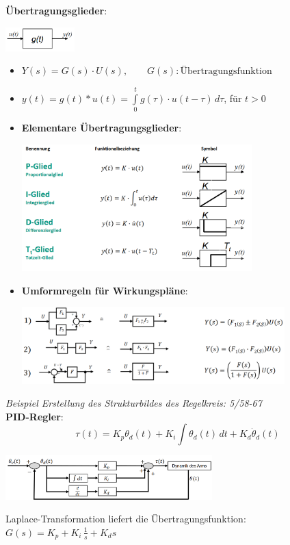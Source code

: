 \textbf{Übertragungsglieder}:
\begin{center}
	\includegraphics[width=0.2\textwidth]{images/uglied.png}
\end{center}
\begin{itemize}
	\item $Y(s)=G(s)\cdot U(s),\qquad G(s)\colon\text{Übertragungsfunktion}$ 
	\item $y(t)=g(t)*u(t)=\int\limits_0^{t} g(\tau)\cdot u(t-\tau)\, d\tau$, für $t>0$
	\item \textbf{Elementare Übertragungsglieder}: 
	\begin{center}
		\includegraphics[width=0.7\textwidth]{images/pidt.png}
	\end{center}
 	\item \textbf{Umformregeln für Wirkungspläne}:
 	\begin{center}
 		\includegraphics[width=0.8\textwidth]{images/uglied-rules.png}
 	\end{center}
\end{itemize}

\textit{Beispiel Erstellung des Strukturbildes des Regelkreis: 5/58-67}\\

\textbf{PID-Regler}:
$$\tau(t)=K_p\theta_d(t)+K_i\int\theta_d(t)\, dt+K_d\dot{\theta}_d(t)$$
\begin{center}
	\includegraphics[width=0.6\textwidth]{images/pid.png}
\end{center}
Laplace-Transformation liefert die Übertragungsfunktion: $G(s)=K_p+K_i\,\frac{1}{s}+K_ds$

